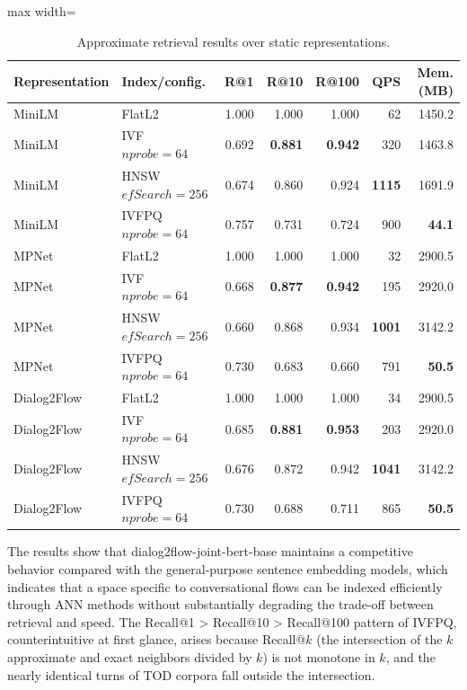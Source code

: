 \documentclass[runningheads]{llncs}
\begin{document}
\begin{table}[ht]
\centering
\small
\setlength{\tabcolsep}{4pt}
\caption{Approximate retrieval results over static representations.}
\label{tab:static_representative}
\begin{adjustbox}{max width=\textwidth}
\begin{tabular}{llrrrrr}
\toprule
Representation & Index/config. & R@1 & R@10 & R@100 & QPS & Mem. (MB) \\
\midrule
MiniLM & FlatL2 & 1.000 & 1.000 & 1.000 & 62 & 1450.2 \\
MiniLM & IVF $nprobe=64$ & 0.692 & \textbf{0.881} & \textbf{0.942} & 320 & 1463.8 \\
MiniLM & HNSW $efSearch=256$ & 0.674 & 0.860 & 0.924 & \textbf{1115} & 1691.9 \\
MiniLM & IVFPQ $nprobe=64$ & 0.757 & 0.731 & 0.724 & 900 & \textbf{44.1} \\
\midrule
MPNet & FlatL2 & 1.000 & 1.000 & 1.000 & 32 & 2900.5 \\
MPNet & IVF $nprobe=64$ & 0.668 & \textbf{0.877} & \textbf{0.942} & 195 & 2920.0 \\
MPNet & HNSW $efSearch=256$ & 0.660 & 0.868 & 0.934 & \textbf{1001} & 3142.2 \\
MPNet & IVFPQ $nprobe=64$ & 0.730 & 0.683 & 0.660 & 791 & \textbf{50.5} \\
\midrule
Dialog2Flow & FlatL2 & 1.000 & 1.000 & 1.000 & 34 & 2900.5 \\
Dialog2Flow & IVF $nprobe=64$ & 0.685 & \textbf{0.881} & \textbf{0.953} & 203 & 2920.0 \\
Dialog2Flow & HNSW $efSearch=256$ & 0.676 & 0.872 & 0.942 & \textbf{1041} & 3142.2 \\
Dialog2Flow & IVFPQ $nprobe=64$ & 0.730 & 0.688 & 0.711 & 865 & \textbf{50.5} \\
\bottomrule
\end{tabular}
\end{adjustbox}
\end{table}

The results show that dialog2flow-joint-bert-base maintains a competitive behavior compared with the general-purpose sentence embedding models, which indicates that a space specific to conversational flows can be indexed efficiently through ANN methods without substantially degrading the trade-off between retrieval and speed. The Recall@1 > Recall@10 > Recall@100 pattern of IVFPQ, counterintuitive at first glance, arises because Recall@$k$ (the intersection of the $k$ approximate and exact neighbors divided by $k$) is not monotone in $k$, and the nearly identical turns of TOD corpora fall outside the intersection.
\end{document}
